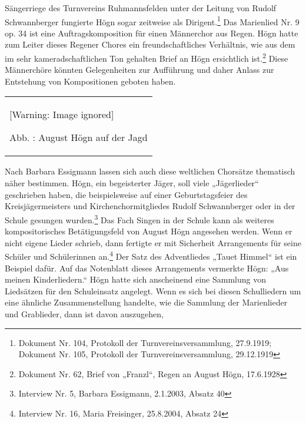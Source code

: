 \documentclass[a4paper]{article}
\newcounter{Abb}
\renewcommand\theAbb{\arabic{Abb}}
\begin{document}
Sängerriege des Turnvereins Ruhmannsfelden unter der Leitung von Rudolf
Schwannberger fungierte Högn sogar zeitweise als Dirigent.\footnote{
Dokument Nr. 104, Protokoll der Turnvereinsversammlung, 27.9.1919;
Dokument Nr. 105, Protokoll der Turnvereinsversammlung, 29.12.1919} Das
Marienlied Nr. 9 op. 34 ist eine Auftragskomposition für einen
Männerchor aus Regen. Högn hatte zum Leiter dieses Regener Chores ein
freundschaftliches Verhältnis, wie aus dem im sehr kameradschaftlichen
Ton gehalten Brief an Högn ersichtlich ist.\footnote{ Dokument Nr. 62,
Brief von „Franzl“, Regen an August Högn, 17.6.1928} Diese Männerchöre
könnten Gelegenheiten zur Aufführung und daher Anlass zur Entstehung
von Kompositionen geboten haben.

\begin{flushleft}
\tablefirsthead{}
\tablehead{}
\tabletail{}
\tablelasttail{}
\begin{supertabular}{m{2.809cm}}

\begin{center}
 [Warning: Image ignored] %

\end{center}
Abb. \stepcounter{Abb}{\theAbb}: August Högn auf der Jagd\\
\end{supertabular}
\end{flushleft}
Nach Barbara Essigmann lassen sich auch diese weltlichen Chorsätze
thematisch näher bestimmen. Högn, ein begeisterter Jäger, soll viele
„Jägerlieder“ geschrieben haben, die beispielsweise auf einer
Geburtstagsfeier des Kreisjägermeisters und Kirchenchormitgliedes
Rudolf Schwannberger oder in der Schule gesungen wurden.\footnote{
Interview Nr. 5, Barbara Essigmann, 2.1.2003, Absatz 40} Das Fach
Singen in der Schule kann als weiteres kompositorisches Betätigungsfeld
von August Högn angesehen werden. Wenn er nicht eigene Lieder schrieb,
dann fertigte er mit Sicherheit Arrangements für seine Schüler und
Schülerinnen an.\footnote{ Interview Nr. 16, Maria Freisinger,
25.8.2004, Absatz 24} Der Satz des Adventliedes „Tauet Himmel“ ist ein
Beispiel dafür. Auf das Notenblatt dieses Arrangements vermerkte Högn:
„Aus meinen Kinderliedern.“ Högn hatte sich anscheinend eine Sammlung
von Liedsätzen für den Schuleinsatz angelegt. Wenn es sich bei diesen
Schulliedern um eine ähnliche Zusammenstellung handelte, wie die
Sammlung der Marienlieder und Grablieder, dann ist davon auszugehen,
\end{document}
